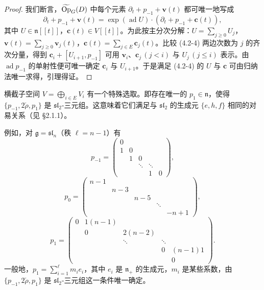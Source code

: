 \begin{proof}
我们断言，$\widetilde{\operatorname{Op}}_G(D)$ 中每个元素 $\partial_t+p_{-1}+\mathbf{v}(t)$ 都可唯一地写成
\begin{equation}
    \partial_t+p_{-1}+\mathbf{v}(t)=\exp(\operatorname{ad}U)\cdot(\partial_t+p_{-1}+\mathbf{c}(t)),
    \tag{4.2-4}
\end{equation}
其中 $U\in\mathfrak{n}[[t]]$，$\mathbf{c}(t)\in V[[t]]$。为此按主分次分解：$U=\sum_{j\ge0}U_j$，$\mathbf{v}(t)=\sum_{j\ge0}\mathbf{v}_j(t)$，$\mathbf{c}(t)=\sum_{j\in E}\mathbf{c}_j(t)$。比较 (4.2-4) 两边次数为 $j$ 的齐次分量，得到 $\mathbf{c}_i+[U_{i+1},p_{-1}]$ 可用 $\mathbf{v}_i$、$\mathbf{c}_j\,(j<i)$ 与 $U_j\,(j\le i)$ 表示。由 $\operatorname{ad}p_{-1}$ 的单射性便可唯一确定 $\mathbf{c}_i$ 与 $U_{i+1}$。于是满足 (4.2-4) 的 $U$ 与 $\mathbf{c}$ 可由归纳法唯一求得，引理得证。
\end{proof}


横截子空间 $V=\bigoplus_{i\in E}V_i$ 有一个特殊选取。即存在唯一的 $p_1\in\mathfrak{n}$，使得 $\{p_{-1},2\check{\rho},p_1\}$ 是 $\mathfrak{sl}_2$-三元组。这意味着它们满足与 $\mathfrak{sl}_2$ 的生成元 $\{e,h,f\}$ 相同的对易关系（见 §2.1.1）。

例如，对 $\mathfrak{g}=\mathfrak{sl}_n$（秩 $\ell=n-1$）有
\[
    p_{-1}=\begin{pmatrix}
        0&&&&\\
        1&0&&&\\
        &1&0&&\\
        &&\ddots&\ddots&\\
        &&&1&0
    \end{pmatrix},
\]
\[
    p_0=\begin{pmatrix}
        n-1&&&&\\
        &n-3&&&\\
        &&n-5&&\\
        &&&\ddots&\\
        &&&&-n+1
    \end{pmatrix},
\]
\[
    p_1=\begin{pmatrix}
        0&1(n-1)&&&\\
        &0&2(n-2)&&\\
        &&\ddots&\ddots&\\
        &&&0&(n-1)1\\
        &&&&0
    \end{pmatrix}.
\]
一般地，$p_1=\sum_{i=1}^{\ell}m_ie_i$，其中 $e_i$ 是 $\mathfrak{n}_+$ 的生成元，$m_i$ 是某些系数，由 $\{p_{-1},2\check{\rho},p_1\}$ 是 $\mathfrak{sl}_2$-三元组这一条件唯一确定。

